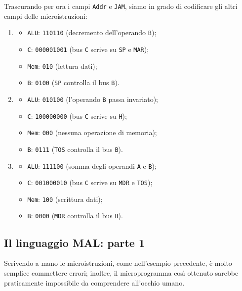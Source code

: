 \documentclass[a4paper,12pt]{scrreprt}
\begin{document}
Trascurando per ora i campi \lstinline{Addr} e \lstinline{JAM}, siamo in grado
di codificare gli altri campi delle microistruzioni:
\begin{enumerate}
  \item
  \begin{itemize}
    \item \lstinline{ALU}: \lstinline{110110} (decremento dell'operando \lstinline{B});
    \item \lstinline{C}: \lstinline{000001001} (bus \lstinline{C} scrive su
    \lstinline{SP} e \lstinline{MAR});
    \item \lstinline{Mem}: \lstinline{010} (lettura dati);
    \item \lstinline{B}: \lstinline{0100} (\lstinline{SP} controlla il bus \lstinline{B}).
  \end{itemize}
  \item
  \begin{itemize}
    \item \lstinline{ALU}: \lstinline{010100} (l'operando \lstinline{B} passa invariato);
    \item \lstinline{C}: \lstinline{100000000} (bus \lstinline{C} scrive su
    \lstinline{H});
    \item \lstinline{Mem}: \lstinline{000} (nessuna operazione di memoria);
    \item \lstinline{B}: \lstinline{0111} (\lstinline{TOS} controlla il bus \lstinline{B}).
  \end{itemize}
  \item
  \begin{itemize}
    \item \lstinline{ALU}: \lstinline{111100} (somma degli operandi
    \lstinline{A} e \lstinline{B});
    \item \lstinline{C}: \lstinline{001000010} (bus \lstinline{C} scrive su
    \lstinline{MDR} e \lstinline{TOS});
    \item \lstinline{Mem}: \lstinline{100} (scrittura dati);
    \item \lstinline{B}: \lstinline{0000} (\lstinline{MDR} controlla il bus \lstinline{B}).
  \end{itemize}
\end{enumerate}

\subsection{Il linguaggio MAL: parte 1}

Scrivendo a mano le microistruzioni, come nell'esempio precedente, è molto
semplice commettere errori; inoltre, il microprogramma così ottenuto sarebbe
praticamente impossibile da comprendere all'occhio umano.
\end{document}
